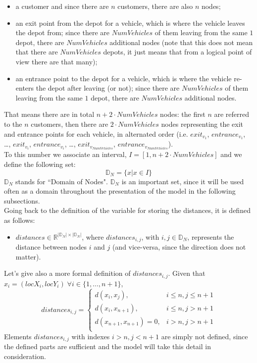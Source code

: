 \documentclass[../main.tex]{subfiles}
\begin{document}
\begin{itemize}
    \item a customer and since there are $n$ customers, there are also $n$ nodes;
    \item an exit point from the depot for a vehicle, which is where the vehicle leaves the depot from; since there are $NumVehicles$ of them leaving from the same $1$ depot, there are $NumVehicles$ additional nodes (note that this does not mean that there are $NumVehicles$ depots, it just means that from a logical point of view there are that many);
    \item an entrance point to the depot for a vehicle, which is where the vehicle re-enters the depot after leaving (or not); since there are $NumVehicles$ of them leaving from the same $1$ depot, there are $NumVehicles$ additional nodes.
\end{itemize}
That means there are in total $n + 2 \cdot NumVehicles$ nodes: the first $n$ are referred to the $n$ customers, then there are $2 \cdot NumVehicles$ nodes representing the exit and entrance points for each vehicle, in alternated order (i.e. $exit_{v_1}$, $entrance_{v_1}$, \dots, $exit_{v_i}$, $entrance_{v_i}$, \dots, $exit_{v_{NumVehicles}}$, $entrance_{v_{NumVehicles}}$).\\
To this number we associate an interval, $I = [1, n + 2 \cdot NumVehicles]$ and we define the following set: $$\mathbb{D}_N = \{x | x \in I\}$$
$\mathbb{D}_N$ stands for ``Domain of Nodes".
$\mathbb{D}_N$ is an important set, since it will be used often as a domain throughout the presentation of the model in the following subsections.\\
Going back to the definition of the variable for storing the distances, it is defined as follows:
\begin{itemize}
    \item $distances \in \mathbb{R}^{|\mathbb{D}_N|\times{}|\mathbb{D}_N|}$, where $distances_{i,j}$, with $i,j \in \mathbb{D}_N$, represents the distance between nodes $i$ and $j$ (and vice-versa, since the direction does not matter).
\end{itemize}
Let's give also a more formal definition of $distances_{i,j}$. Given that $x_i = (locX_i, locY_i) \; \forall i \in \{1,\dots,n+1\}$,
$$distances_{i,j} = {
    \begin{cases}
        d(x_i, x_j), & \text{$i \leq n, j \leq n+1$} \\
        d(x_i, x_{n+1}), & \text{$i \leq n, j > n+1$} \\
        d(x_{n+1}, x_{n+1}) = 0, & \text{$i > n, j > n+1$} \\
    \end{cases}
}$$
Elements $distances_{i,j}$ with indexes $i > n, j < n+1$ are simply not defined, since the defined parts are sufficient and the model will take this detail in consideration.
\end{document}
